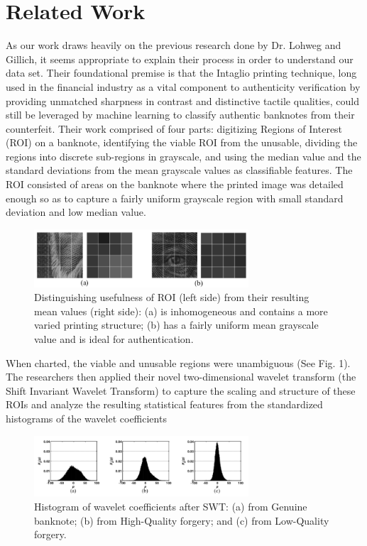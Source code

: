 \documentclass{article}
\begin{document}
\section{Related Work}
As our work draws heavily on the previous research done by Dr. Lohweg and Gillich, it seems appropriate to explain their process in order to understand our data set. Their foundational premise is that the Intaglio printing technique, long used in the financial industry as a vital component to authenticity verification by providing unmatched sharpness in contrast and distinctive tactile qualities, could still be leveraged by machine learning to classify authentic banknotes from their counterfeit. Their work comprised of four parts: digitizing Regions of Interest (ROI) on a banknote, identifying the viable ROI from the unusable, dividing the regions into discrete sub-regions in grayscale, and using the median value and the standard deviations from the mean grayscale values as classifiable features. The ROI consisted of areas on the banknote where the printed image was detailed enough so as to capture a fairly uniform grayscale region with small standard deviation and low median value.
\begin{figure}
  \centering
\includegraphics[width=80mm]{roi_distinguish.png}
  \caption{Distinguishing usefulness of ROI (left side) from their resulting mean values (right side): (a) is inhomogeneous and contains a more varied printing structure; (b) has a fairly uniform mean grayscale value and is ideal for authentication.}
\end{figure}
\newline\newline
When charted, the viable and unusable regions were unambiguous (See Fig. 1). The researchers then applied their novel two-dimensional wavelet transform (the Shift Invariant Wavelet Transform) to capture the scaling and structure of these ROIs and analyze the resulting statistical features from the standardized histograms of the wavelet coefficients 
\begin{figure}
  \centering
\includegraphics[width=80mm]{histogram.png}
  \caption{Histogram of wavelet coefficients after SWT: (a) from Genuine banknote; 
(b) from High-Quality forgery; and (c) from Low-Quality forgery.}
\end{figure}
\end{document}
